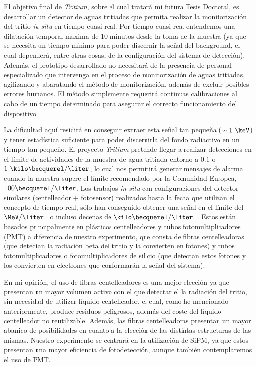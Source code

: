 El objetivo final de \textit{Tritium}, sobre el cual tratará mi futura Tesis Doctoral, es desarrollar un detector de aguas tritiadas que permita realizar la monitorización del tritio \textit{in situ} en tiempo cuasi-real. Por tiempo cuasi-real entendemos una dilatación temporal máxima de 10 minutos desde la toma de la muestra (ya que se necesita un tiempo mínimo para poder discernir la señal del background, el cual dependerá, entre otras cosas, de la configuración del sistema de detección). Además, el prototipo desarrollado no necesitará de la presencia de personal especializado que intervenga en el proceso de monitorización de aguas tritiadas, agilizando y abaratando el método de monitorización, además de excluir posibles errores humanos. El método simplemente requerirá continuas calibraciones al cabo de un tiempo determinado para asegurar el correcto funcionamiento del dispositivo. 

La dificultad aquí residirá en conseguir extraer esta señal tan pequeña ($\backsim 1~\keV$) y tener estadística suficiente para poder discernirla del fondo radiactivo en un tiempo tan pequeño. El proyecto \textit{Tritium} pretende llegar a realizar detecciones en el límite de actividades de la muestra de agua tritiada entorno a $0.1$ o $1~\kilo\becquerel/\liter$, lo cual nos permitirá generar mensajes de alarma cuando la muestra supere el límite recomendado por la Comunidad Europea, $100\becquerel/\liter$. Los trabajos \textit{in situ} con configuraciones del detector similares (centelleador + fotosensor) realizados hasta la fecha que utilizan el concepto de tiempo real, sólo han conseguido obtener una señal en el límite del $\MeV/\liter$~\cite{TesisTritio} o incluso decenas de $\kilo\becquerel/\liter$~\cite{Rat}. Estos están basados principalmente en plásticos centelleadores y tubos fotomultiplicadores (PMT) a diferencia de nuestro experimento, que consta de fibras centelleadoras (que detectan la radiación beta del tritio y la convierten en fotones) y tubos fotomultiplicadores o fotomultiplicadores de silicio (que detectan estos fotones y los convierten en electrones que conformarán la señal del sistema). 

En mi opinión, el uso de fibras centelleadores es una mejor elección ya que presentan un mayor volumen activo con el que detectar el la radiación del tritio,  sin necesidad de utilizar líquido centelleador, el cual, como he mencionado anteriormente, produce residuos peligrosos, además del coste del líquido centelleador no reutilizable. Además, las fibras centelleadoras presentan un mayor abanico de posibilidades en cuanto a la elección de las distintas estructuras de las mismas. Nuestro experimento se centrará en la utilización de SiPM, ya que estos presentan una mayor eficiencia de fotodetección, aunque también contemplaremos el uso de PMT. 

